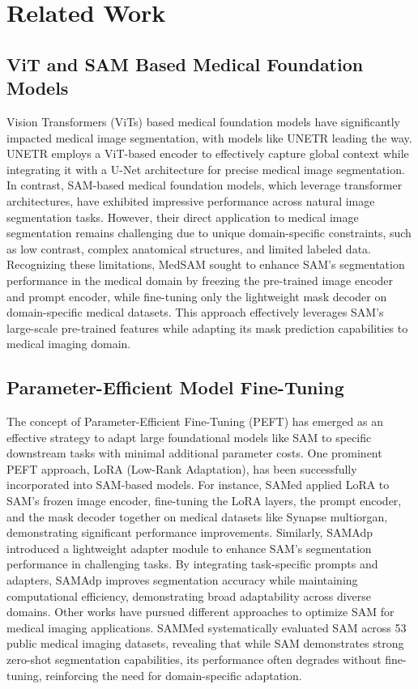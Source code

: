 \section{Related Work}
\subsection{ViT and SAM Based Medical Foundation Models}

\par Vision Transformers (ViTs) based medical foundation models have significantly impacted medical image segmentation, with models like UNETR \cite{r8} leading the way. UNETR employs a ViT-based encoder to effectively capture global context while integrating it with a U-Net architecture for precise medical image segmentation. In contrast, SAM-based medical foundation models, which leverage transformer architectures, have exhibited impressive performance across natural image segmentation tasks. However, their direct application to medical image segmentation remains challenging due to unique domain-specific constraints, such as low contrast, complex anatomical structures, and limited labeled data. Recognizing these limitations, MedSAM \cite{r10} sought to enhance SAM’s segmentation performance in the medical domain by freezing the pre-trained image encoder and prompt encoder, while fine-tuning only the lightweight mask decoder on domain-specific medical datasets. This approach effectively leverages SAM’s large-scale pre-trained features while adapting its mask prediction capabilities to medical imaging domain.

\subsection{Parameter-Efficient Model Fine-Tuning}
The concept of Parameter-Efficient Fine-Tuning (PEFT) has emerged as an effective strategy to adapt large foundational models like SAM to specific downstream tasks with minimal additional parameter costs. One prominent PEFT approach, LoRA (Low-Rank Adaptation), has been successfully incorporated into SAM-based models. For instance, SAMed \cite{r11} applied LoRA to SAM’s frozen image encoder, fine-tuning the LoRA layers, the prompt encoder, and the mask decoder together on medical datasets like Synapse multiorgan, demonstrating significant performance improvements. Similarly, SAMAdp \cite{r19} introduced a lightweight adapter module to enhance SAM's segmentation performance in challenging tasks. By integrating task-specific prompts and adapters, SAMAdp improves segmentation accuracy while maintaining computational efficiency, demonstrating broad adaptability across diverse domains. Other works have pursued different approaches to optimize SAM for medical imaging applications. SAMMed \cite{r9} systematically evaluated SAM across 53 public medical imaging datasets, revealing that while SAM demonstrates strong zero-shot segmentation capabilities, its performance often degrades without fine-tuning, reinforcing the need for domain-specific adaptation.

